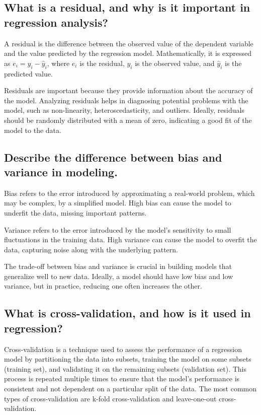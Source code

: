 \documentclass[12pt]{article}
\begin{document}
\subsection{What is a residual, and why is it important in regression analysis?}

A residual is the difference between the observed value of the dependent variable and the value predicted by the regression model. Mathematically, it is expressed as \( e_i = y_i - \hat{y}_i \), where \( e_i \) is the residual, \( y_i \) is the observed value, and \( \hat{y}_i \) is the predicted value.

Residuals are important because they provide information about the accuracy of the model. Analyzing residuals helps in diagnosing potential problems with the model, such as non-linearity, heteroscedasticity, and outliers. Ideally, residuals should be randomly distributed with a mean of zero, indicating a good fit of the model to the data.

\subsection{Describe the difference between bias and variance in modeling.}

Bias refers to the error introduced by approximating a real-world problem, which may be complex, by a simplified model. High bias can cause the model to underfit the data, missing important patterns.

Variance refers to the error introduced by the model's sensitivity to small fluctuations in the training data. High variance can cause the model to overfit the data, capturing noise along with the underlying pattern.

The trade-off between bias and variance is crucial in building models that generalize well to new data. Ideally, a model should have low bias and low variance, but in practice, reducing one often increases the other.

\subsection{What is cross-validation, and how is it used in regression?}

Cross-validation is a technique used to assess the performance of a regression model by partitioning the data into subsets, training the model on some subsets (training set), and validating it on the remaining subsets (validation set). This process is repeated multiple times to ensure that the model's performance is consistent and not dependent on a particular split of the data. The most common types of cross-validation are k-fold cross-validation and leave-one-out cross-validation.
\end{document}
